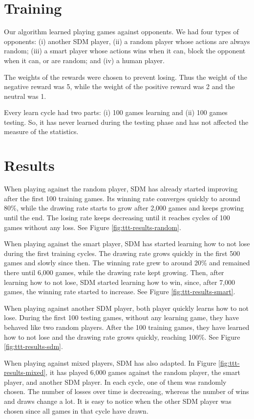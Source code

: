 \section{Training}

Our algorithm learned playing games against opponents. We had four types of opponents: (i) another SDM player, (ii) a random player whose actions are always random; (iii) a smart player whose actions wins when it can, block the opponent when it can, or are random; and (iv) a human player.

The weights of the rewards were chosen to prevent losing. Thus the weight of the negative reward was 5, while the weight of the positive reward was 2 and the neutral was 1.

Every learn cycle had two parts: (i) 100 games learning and (ii) 100 games testing. So, it has never learned during the testing phase and has not affected the measure of the statistics.


\section{Results}

When playing against the random player, SDM has already started improving after the first 100 training games. Its winning rate converges quickly to around 80\%, while the drawing rate starts to grow after 2,000 games and keeps growing until the end. The losing rate keeps decreasing until it reaches cycles of 100 games without any loss. See Figure \ref{fig:ttt-results-random}.

When playing against the smart player, SDM has started learning how to not lose during the first training cycles. The drawing rate grows quickly in the first 500 games and slowly since then. The winning rate grew to around 20\% and remained there until 6,000 games, while the drawing rate kept growing. Then, after learning how to not lose, SDM started learning how to win, since, after 7,000 games, the winning rate started to increase. See Figure \ref{fig:ttt-results-smart}.

When playing against another SDM player, both player quickly learns how to not lose. During the first 100 testing games, without any learning game, they have behaved like two random players. After the 100 training games, they have learned how to not lose and the drawing rate grows quickly, reaching 100\%. See Figure \ref{fig:ttt-results-sdm}.

When playing against mixed players, SDM has also adapted. In Figure \ref{fig:ttt-results-mixed}, it has played 6,000 games against the random player, the smart player, and another SDM player. In each cycle, one of them was randomly chosen. The number of losses over time is decreasing, whereas the number of wins and draws change a lot. It is easy to notice when the other SDM player was chosen since all games in that cycle have drawn.


